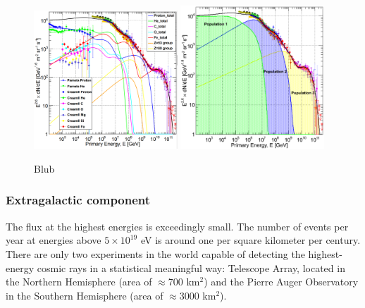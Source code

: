 \begin{figure}
\centering
\includegraphics[width=0.48\textwidth]{chapter3/img/fit1gaisser.png}
\includegraphics[width=0.48\textwidth]{chapter3/img/fit2gaisser.png}
\caption{Blub}
\label{fig:fitsgaisser}
\end{figure}

\subsubsection{Extragalactic component}
The flux at the highest energies is exceedingly small. The number of events per year at energies above $5 \times 10^{19}$ eV is around one per square kilometer per century. There are only two experiments in the world capable of detecting the highest-energy cosmic rays in a statistical meaningful way: Telescope Array, located in the Northern Hemisphere (area of $\approx$700 km$^2$) and the Pierre Auger Observatory in the Southern Hemisphere (area of $\approx$3000 km$^2$).

